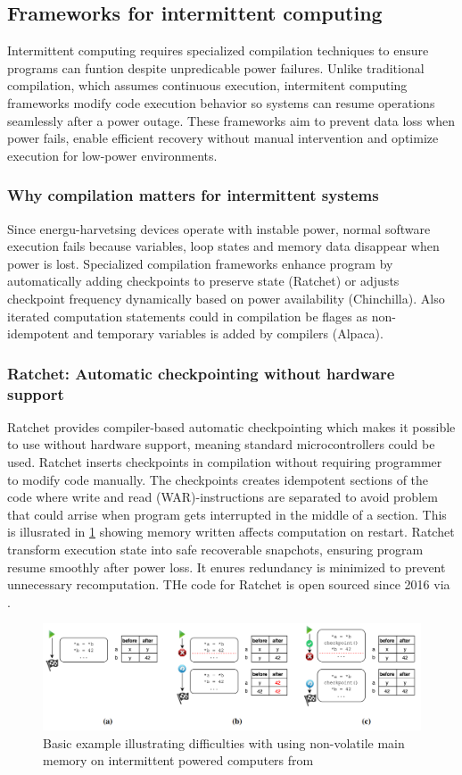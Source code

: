 \documentclass[article,a4paper]{IEEEtran}
\begin{document}
\subsection{Frameworks for intermittent computing}
Intermittent computing requires specialized compilation techniques to ensure programs can funtion despite unpredicable power failures. Unlike traditional compilation, which assumes continuous execution, intermitent computing frameworks modify code execution behavior so systems can resume operations seamlessly after a power outage. These frameworks aim to prevent data loss when power fails, enable efficient recovery without manual intervention and optimize execution for low-power environments. 
\subsubsection{Why compilation matters for intermittent systems}
Since energu-harvetsing devices operate with instable power, normal software execution fails because variables, loop states and memory data disappear when power is lost. Specialized compilation frameworks enhance program by automatically adding checkpoints to preserve state (Ratchet) or adjusts checkpoint frequency dynamically based on power availability (Chinchilla). Also iterated computation statements could in compilation be flages as non-idempotent and temporary variables is added by compilers (Alpaca). 
\subsubsection{Ratchet: Automatic checkpointing without hardware support}
Ratchet provides compiler-based automatic checkpointing which makes it possible to use without hardware support, meaning standard microcontrollers could be used. Ratchet inserts checkpoints in compilation without requiring programmer to modify code manually. The checkpoints creates idempotent sections of the code where write and read (WAR)-instructions are separated to avoid problem that could arrise when program gets interrupted in the middle of a section. This is illusrated in \ref{fig2_WAR_problem} showing memory written affects computation on restart. 
\newline\newline
Ratchet transform execution state into safe recoverable snapchots, ensuring program resume smoothly after power loss. It enures redundancy is minimized to prevent unnecessary recomputation. THe code for Ratchet is open sourced since 2016 via \cite{Ratchetsrc}.
\begin{figure}
    \includegraphics[width=\columnwidth]{WAR-problem.png}
    \caption{ Basic example illustrating difficulties with using non-volatile main memory on intermittent powered computers from \cite{Ratchet} }
    \label{fig2_WAR_problem}
\end{figure}
\end{document}
